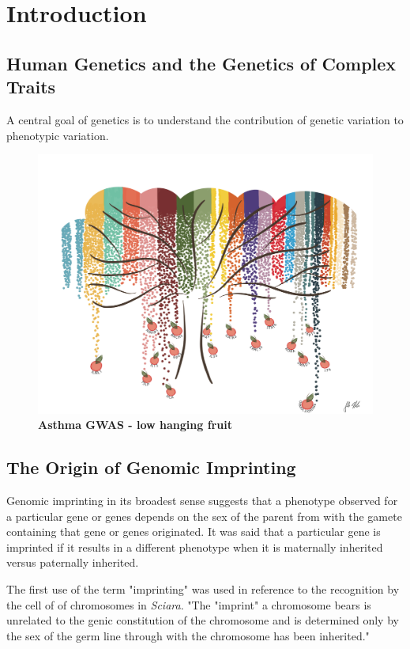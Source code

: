\chapter{Introduction}

\section{Human Genetics and the Genetics of Complex Traits}

A central goal of genetics is to understand the contribution of genetic variation to phenotypic variation. 


\begin{figure}
\centering
\includegraphics[width=8in]{img/ch01/fig-01-lowhangingfruit.pdf}
\caption[Low Hanging Fruit.]{\textbf{Asthma GWAS - low hanging fruit}}
\label{fig:lowhangingfruit}
\end{figure}


\section{The Origin of Genomic Imprinting }

Genomic imprinting in its broadest sense suggests that a phenotype observed for a particular gene or genes depends on the sex of the parent from with the gamete containing that gene or genes originated\cite{Sapienza:1989vm}. It was said that a particular gene is imprinted if it results in a different phenotype when it is maternally inherited versus paternally inherited.

The first use of the term "imprinting" was used in reference to the recognition by the cell of of chromosomes in \textit{Sciara}\cite{Crouse:1960vc,Sapienza:1989vm}. "The "imprint" a chromosome bears is unrelated to the genic constitution of the chromosome and is determined only by the sex of the germ line through with the chromosome has been inherited."\cite{Crouse:1960vc} 

